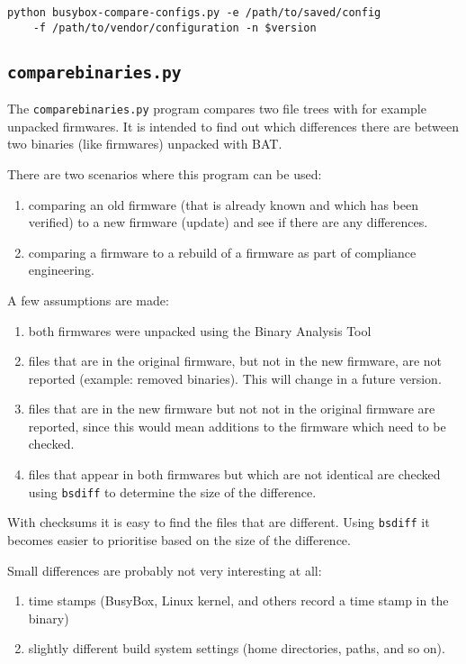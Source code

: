 \documentclass[10pt,a4paper]{article}
\begin{document}
\begin{verbatim}
python busybox-compare-configs.py -e /path/to/saved/config
    -f /path/to/vendor/configuration -n $version
\end{verbatim}

\subsection{\texttt{comparebinaries.py}}

The \texttt{comparebinaries.py} program compares two file trees with for example
unpacked firmwares. It is intended to find out which differences there are
between two binaries (like firmwares) unpacked with BAT.

There are two scenarios where this program can be used:

\begin{enumerate}
\item comparing an old firmware (that is already known and which has been
verified) to a new firmware (update) and see if there are any differences.
\item comparing a firmware to a rebuild of a firmware as part of compliance
engineering.
\end{enumerate}

A few assumptions are made:

\begin{enumerate}
\item both firmwares were unpacked using the Binary Analysis Tool
\item files that are in the original firmware, but not in the new firmware, are
not reported (example: removed binaries). This will change in a future version.
\item files that are in the new firmware but not not in the original firmware are
reported, since this would mean additions to the firmware which need to be
checked.
\item files that appear in both firmwares but which are not identical are
checked using \texttt{bsdiff} to determine the size of the difference.
\end{enumerate}

With checksums it is easy to find the files that are different. Using
\texttt{bsdiff} it becomes easier to prioritise based on the size of the
difference.

Small differences are probably not very interesting at all:

\begin{enumerate}
\item time stamps (BusyBox, Linux kernel, and others record a time stamp in the
binary)
\item slightly different build system settings (home directories, paths, and
so on).
\end{enumerate}
\end{document}
